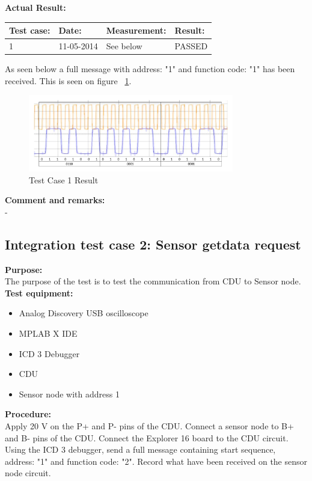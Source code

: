\textbf{Actual Result:}\\
\begin{table}[H]
\centering
\begin{tabular}{|p{2cm}|p{2cm}|p{3cm}|p{2cm}|}\hline
\textbf{Test case:} & \textbf{Date:} & \textbf{Measurement:} & \textbf{Result:} \\ \hline
1 & 11-05-2014 & See below & PASSED \\ \hline
\end{tabular}
\end{table}
As seen below a full message with address: "1" and function code: "1" has been received. This is seen on figure ~\ref{fig:InteTestCase1}.
\begin{figure}[H]
\centering
\includegraphics[width=0.8\textwidth]{billeder/CDUtestcase9}
\caption{Test Case 1 Result}
\label{fig:InteTestCase1}
\end{figure}

\textbf{Comment and remarks:}\\
-\\

\subsection{Integration test case 2: Sensor getdata request}
\textbf{Purpose:}\\
The purpose of the test is to test the communication from CDU to Sensor node.\\

\textbf{Test equipment:}
\begin{itemize}
\item Analog Discovery USB oscilloscope
\item MPLAB X IDE
\item ICD 3 Debugger
\item CDU
\item Sensor node with address 1
\end{itemize}

\textbf{Procedure:}\\
Apply 20 V on the P+ and P- pins of the CDU. Connect a sensor node to B+ and B- pins of the CDU. Connect the Explorer 16 board to the CDU circuit. Using the ICD 3 debugger, send a full message containing start sequence, address: "1" and function code: "2". Record what have been received on the sensor node circuit.\\

